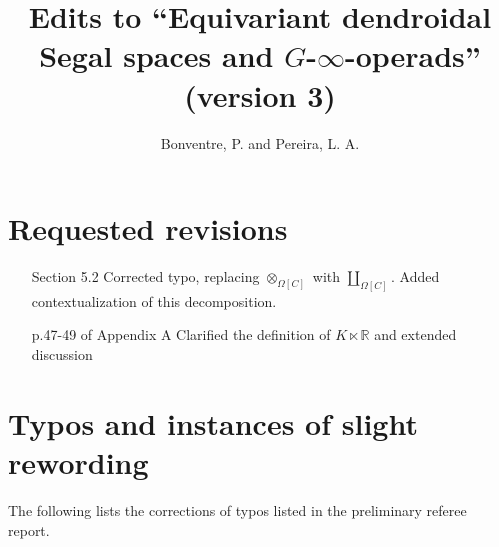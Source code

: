 \documentclass{article}
\begin{document}
 
 
\title{Edits to ``Equivariant dendroidal Segal spaces and $G$-$\infty$-operads'' (version 3)
\\[12pt]} %
 
\author{Bonventre, P. and Pereira, L. A.}
 
\maketitle
 
 
\section{Requested revisions}
\begin{itemize}
\item[Section 5.2] Corrected typo, replacing $\otimes_{\Omega[C]}$ with $\coprod_{\Omega[C]}$. Added contextualization of this decomposition. 
\item[p.47-49 of Appendix A] Clarified the definition of $K \ltimes \mathbb R$ and extended discussion
\end{itemize}

\section{Typos and instances of slight rewording}
 
The following lists the corrections of typos listed in the preliminary referee report.
\end{document}
